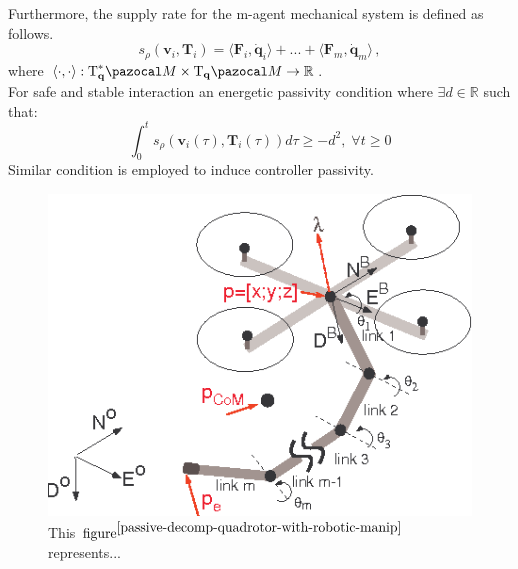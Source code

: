 Furthermore, the supply rate for the m-agent mechanical system is defined as follows.
\begin{equation}
	s_\rho(\textbf{v}_i, \textbf{T}_i) = \langle\textbf{F}_i, \dot{\textbf{q}}_i \rangle + ... + \langle\textbf{F}_m, \dot{\textbf{q}}_m \rangle \, ,
\end{equation}
where $\langle \cdot, \cdot \rangle: \text{T}_{\textbf{q}}^*\Ma \times \text{T}_{\textbf{q}}\Ma  \rightarrow \mathbb{R}$. \\
\noindent For safe and stable interaction an energetic passivity condition where $\exists d\in\mathbb{R}$ such that: 
\begin{equation}
	 \int_{0}^{t}	s_\rho(\textbf{v}_i(\tau), \textbf{T}_i(\tau))d\tau \geq -d^2, \;\forall t\geq 0
\end{equation}
Similar condition is employed to induce controller passivity.

\cite{passive-decomp-quadrotor-with-robotic-manip} 
\cite{passivity-based-formation-load}
\cite{passive-variable-impedance-compliant} 
\cite{max-wrench-min-energy} 
\cite{quadrotor-itneraction-environment} 
\cite{passivity-based-payload-minimum-swing} 
\cite{passivity-based-crop} 
\cite{payload-and-human}
\cite{door-opening} 
\cite{decoupled-aerial-manipulation} 
\cite{passivity-backstepping} 
\cite{passivity-based-physical-interaction}

\begin{figure}[H]
	\includegraphics[width=0.9\columnwidth]{figure/aerial_manip.png}	
	\centering
	\caption{This $\text{figure}^{\cite{passive-decomp-quadrotor-with-robotic-manip}}$ represents... }
	\label{fig:aerial_manip}
\end{figure}